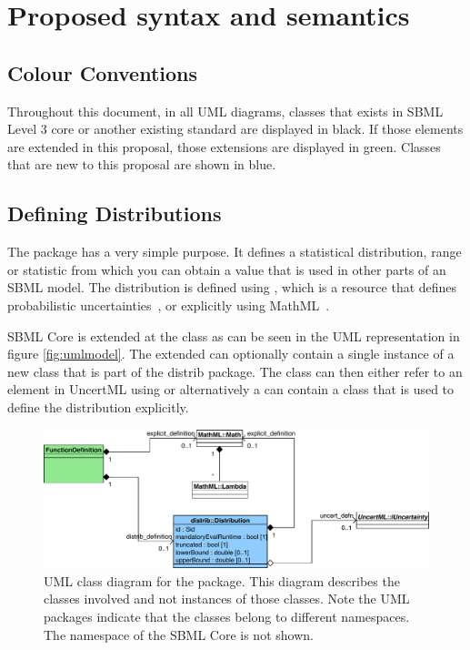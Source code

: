 \documentclass[draftspec]{sbmlpkgspec}
\begin{document}
\section{Proposed syntax and semantics}

\subsection{Colour Conventions}

Throughout this document, in all UML diagrams, classes that exists in
SBML Level 3 core or another existing standard are displayed in
black. If those elements are extended in this proposal, those
extensions are displayed in green. Classes that are new to this
proposal are shown in blue.

\subsection{Defining Distributions}

The \distrib package has a very simple purpose. It defines a
statistical distribution, range or statistic from which you can obtain
a value that is used in other parts of an SBML model. The distribution
is defined using \uncertml, which is a resource that defines
probabilistic uncertainties~\cite{uncertml}, or explicitly using
MathML~\cite{mathml2}.

SBML Core is extended at the \FunctionDefinition class as can be seen
in the UML representation in figure \vref{fig:umlmodel}. The extended
\FunctionDefinition can optionally contain a single instance of a new
class  that is part of the distrib package. The  class can
then either refer to an element in UncertML using or alternatively a
 can contain a \mmath class that is used to define the
distribution explicitly.

\begin{figure}[htb]
\includegraphics[width=1.0\linewidth]{DistribUMLModel.pdf}
\caption{UML class diagram for the \distrib package. This diagram describes the
  classes involved and not instances of those classes. Note the UML packages
  indicate that the classes belong to different namespaces. The
  namespace of the SBML Core is not shown.}
\label{fig:umlmodel}
\end{figure}
\end{document}
